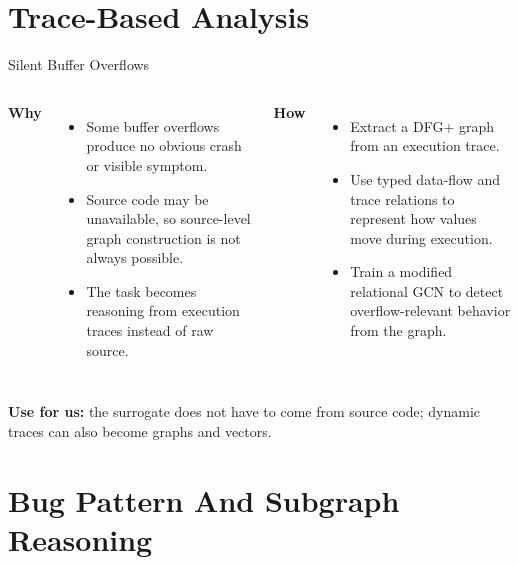 \documentclass[10pt]{beamer}
\begin{document}
\section{Trace-Based Analysis}

\begin{frame}{Silent Buffer Overflows}
  \begin{columns}[T,onlytextwidth]
    \textbf{Why}
    \begin{itemize}
      \item Some buffer overflows produce no obvious crash or visible symptom.
      \item Source code may be unavailable, so source-level graph construction is not always possible.
      \item The task becomes reasoning from execution traces instead of raw source.
    \end{itemize}

    \textbf{How}
    \begin{itemize}
      \item Extract a DFG+ graph from an execution trace.
      \item Use typed data-flow and trace relations to represent how values move during execution.
      \item Train a modified relational GCN to detect overflow-relevant behavior from the graph.
    \end{itemize}
  \end{columns}

  \vspace{0.25cm}
  \textbf{Use for us:} the surrogate does not have to come from source code; dynamic traces can also become graphs and vectors.
\end{frame}

\section{Bug Pattern And Subgraph Reasoning}
\end{document}
